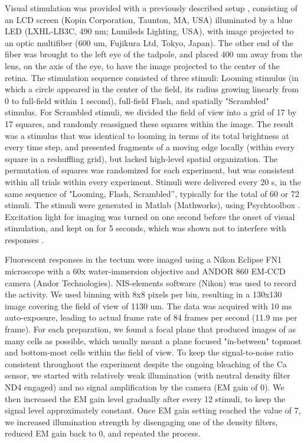 \documentclass{article}
\begin{document}
Visual stimulation was provided with a previously described setup \citep{khakhalin2014}, consisting of an LCD screen (Kopin Corporation, Taunton, MA, USA) illuminated by a blue LED (LXHL-LB3C, 490 nm; Lumileds Lighting, USA), with image projected to an optic multifiber (600 um, Fujikura Ltd, Tokyo, Japan). The other end of the fiber was brought to the left eye of the tadpole, and placed 400 um away from the lens, on the axis of the eye, to have the image projected to the center of the retina. The stimulation sequence consisted of three stimuli: Looming stimulus (in which a circle appeared in the center of the field, its radius growing linearly from 0 to full-field within 1 second), full-field Flash, and spatially "Scrambled" stimulus. For Scrambled stimuli, we divided the field of view into a grid of 17 by 17 squares, and randomly reassigned these squares within the image. The result was a stimulus that was identical to looming in terms of its total brightness at every time step, and presented fragments of a moving edge locally (within every square in a reshuffling grid), but lacked high-level spatial organization. The permutation of squares was randomized for each experiment, but was consistent within all trials within every experiment. Stimuli were delivered every 20 s, in the same sequence of "Looming, Flash, Scrambled”, typically for the total of 60 or 72 stimuli. The stimuli were generated in Matlab (Mathworks), using Psychtoolbox \citep{kleiner2007psychtoolbox}. Excitation light for imaging was turned on one second before the onset of visual stimulation, and kept on for 5 seconds, which was shown not to interfere with responses \citep{xu2011}.

Fluorescent responses in the tectum were imaged using a Nikon Eclipse FN1 microscope with a 60x water-immersion objective and ANDOR 860 EM-CCD camera (Andor Technologies). NIS-elements software (Nikon) was used to record the activity. We used binning with 8x8 pixels per bin, resulting in a 130x130 image covering the field of view of 1130 um. The data was acquired with 10 ms auto-exposure, leading to actual frame rate of 84 frames per second (11.9 ms per frame). For each preparation, we found a focal plane that produced images of as many cells as possible, which usually meant a plane focused "in-between" topmost and bottom-most cells within the field of view. To keep the signal-to-noise ratio consistent throughout the experiment despite the ongoing bleaching of the Ca sensor, we started with relatively weak illumination (with neutral density filter ND4 engaged) and no signal amplification by the camera (EM gain of 0). We then increased the EM gain level gradually after every 12 stimuli, to keep the signal level approximately constant. Once EM gain setting reached the value of 7, we increased illumination strength by disengaging one of the density filters, reduced EM gain back to 0, and repeated the process.
\end{document}

